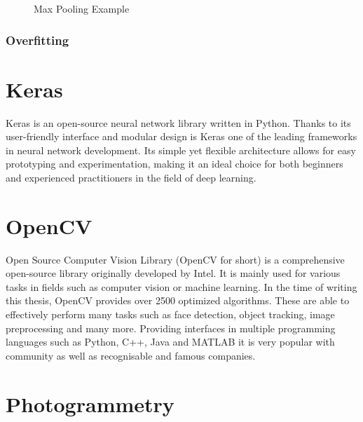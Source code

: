 \begin{figure}
	\caption[Max Pooling Example]{Max Pooling Example \cite{pooling}}
	\label{maxPooling}
\end{figure}

\subsubsection{Overfitting}
\section{Keras \cite{keras}}
Keras is an open-source neural network library written in Python. Thanks to its user-friendly interface and modular design is Keras one of the leading frameworks in neural network development. Its simple yet flexible architecture allows for easy prototyping and experimentation, making it an ideal choice for both beginners and experienced practitioners in the field of deep learning.
\section{OpenCV \cite{opencv}}
Open Source Computer Vision Library (OpenCV for short) is a comprehensive open-source library originally developed by Intel. It is mainly used for various tasks in fields such as computer vision or machine learning. In the time of writing this thesis, OpenCV provides over 2500 optimized algorithms. These are able to effectively perform many tasks such as face detection, object tracking, image preprocessing and many more. Providing interfaces in multiple programming languages such as Python, C++, Java and MATLAB it is very popular with community as well as recognisable and famous companies.%

\section{Photogrammetry}

